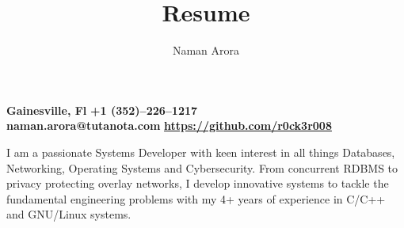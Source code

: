 \documentclass[10]{Resume}
\begin{document}
\renewcommand{\maketitle} {
	\begin{flushleft}
		\textbf{\Huge\theauthor}
	\end{flushleft}
	\begin{flushleft}
		\small{\textbf{{\faMapMarker} \hspace{0.2cm} Gainesville, Fl} \hspace{2.5cm} \textbf{{\faMobile} \hspace{0.2cm} +1 (352)--226--1217} \\
		\textbf{{\faEnvelope} \hspace{0.1cm} naman.arora@tutanota.com} \hspace{0.5cm}
		\textbf{{\faGithub} \hspace{0.1cm} \href{https://github.com/r0ck3r008}{https://github.com/r0ck3r008}}}
	\end{flushleft}
}

\title{Resume}
\author{Naman Arora}
\maketitle


\begin{minipage}[t]{0.4\textwidth} %
	\vspace{-\baselineskip} %
		I am a passionate Systems Developer with keen interest in all things Databases, Networking, Operating Systems and Cybersecurity. From concurrent RDBMS to privacy protecting overlay networks, I develop innovative systems to tackle the fundamental engineering problems with my 4+ years of experience in C/C++ and GNU/Linux systems.
\end{minipage}
\hfill
\begin{minipage}[t]{0.5\textwidth}
	\vspace{-\baselineskip}
	\begin{barchart}{5.5}
	\end{barchart}
\end{minipage}

\end{document}
